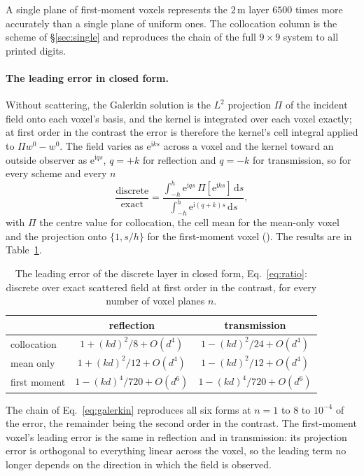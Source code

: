\documentclass[extra,mreferee]{gji}
\begin{document}
A single plane of first-moment
voxels represents the $2$\,m layer $6500$ times more accurately than a single plane of uniform ones.
The collocation column is the scheme of \S\ref{sec:single} and reproduces the chain of the full
$9\times9$ system to all printed digits.

\paragraph{The leading error in closed form.} Without scattering, the Galerkin solution is the
$L^2$ projection $\Pi$ of the incident field onto each voxel's basis, and the kernel is integrated
over each voxel exactly; at first order in the contrast the error is therefore the kernel's cell
integral applied to $\Pi w^0-w^0$. The field varies as $\mathrm{e}^{\mathrm{i}ks}$ across a voxel and the kernel toward
an outside observer as $\mathrm{e}^{\mathrm{i}qs}$, $q=+k$ for reflection and $q=-k$ for transmission, so for every
scheme and every $n$
\begin{equation}\label{eq:ratio}
  \frac{\text{discrete}}{\text{exact}}
  =\frac{\int_{-h}^{h}\mathrm{e}^{\mathrm{i}qs}\,\Pi[\mathrm{e}^{\mathrm{i}ks}]\,\mathrm{d}s}{\int_{-h}^{h}\mathrm{e}^{\mathrm{i}(q+k)s}\,\mathrm{d}s},
\end{equation}
with $\Pi$ the centre value for collocation, the cell mean for the mean-only voxel and the projection
onto $\{1,s/h\}$ for the first-moment voxel (). The results are in Table~\ref{tab:ratio}.
\begin{table}
\centering
\caption{The leading error of the discrete layer in closed form, Eq.~\eqref{eq:ratio}: discrete over exact scattered field at first order in the contrast, for every number of voxel planes $n$.}\label{tab:ratio}
\begin{tabular}{@{}lcc@{}}
\toprule
 & reflection & transmission \\
\midrule
collocation      & $1+(kd)^2/8+O(d^4)$  & $1-(kd)^2/24+O(d^4)$ \\
mean only        & $1+(kd)^2/12+O(d^4)$ & $1-(kd)^2/12+O(d^4)$ \\
first moment     & $1-(kd)^4/720+O(d^6)$ & $1-(kd)^4/720+O(d^6)$ \\
\bottomrule
\end{tabular}
\end{table}
The chain of Eq.~\eqref{eq:galerkin} reproduces all six forms at $n=1$ to $8$ to $10^{-4}$ of the
error, the remainder being the second order in the contrast. The first-moment voxel's leading
error is the same in reflection and in transmission: its projection error is orthogonal to
everything linear across the voxel, so the leading term no longer depends on the direction in which
the field is observed.
\end{document}
